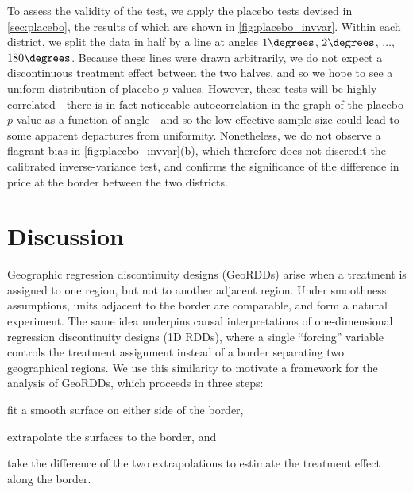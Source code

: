 To assess the validity of the test, we apply the placebo tests devised in \autoref{sec:placebo},
the results of which are shown in \autoref{fig:placebo_invvar}.
Within each district, we split the data in half by a line at angles \(1\degrees\), \(2\degrees\), \(\dotsc\), \(180\degrees\).
Because these lines were drawn arbitrarily, we do not expect a discontinuous treatment effect between the two halves, and so we hope to see a uniform distribution of placebo \(p\)-values.
However, these tests will be highly correlated---there is in fact noticeable autocorrelation in the graph of the placebo \(p\)-value as a function of angle---and so the low effective sample size could lead to some apparent departures from uniformity.
Nonetheless, we do not observe a flagrant bias in \autoref{fig:placebo_invvar}(b), which therefore does not discredit the calibrated inverse-variance test, and confirms the significance of the difference in price at the border between the two districts.

\section{Discussion}

Geographic regression discontinuity designs (GeoRDDs) arise when a treatment is assigned to one region, but not to another adjacent region.
Under smoothness assumptions, units adjacent to the border are comparable, and form a natural experiment.
The same idea underpins causal interpretations of one-dimensional regression discontinuity designs (1D RDDs), where a single ``forcing'' variable controls the treatment assignment instead of a border separating two geographical regions.
We use this similarity to motivate a framework for the analysis of GeoRDDs, which proceeds in three steps:
\begin{flatlist} 
\item fit a smooth surface on either side of the border,
\item extrapolate the surfaces to the border, and 
\item take the difference of the two extrapolations to estimate the treatment effect along the border.
\end{flatlist}

